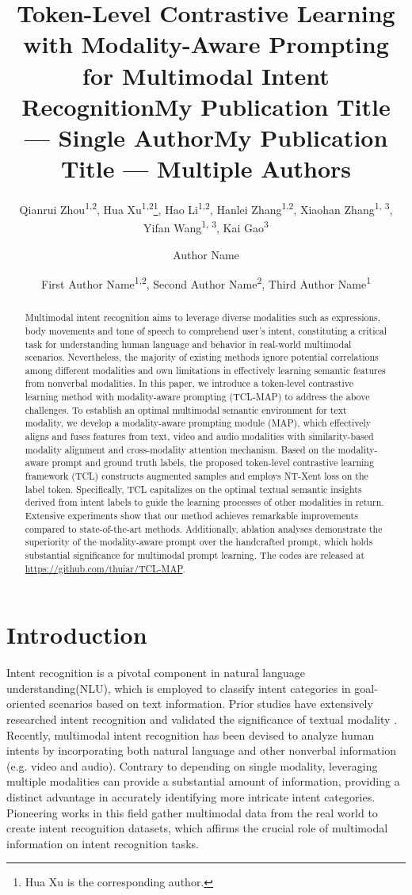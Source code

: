 \documentclass[letterpaper]{article} %
\title{Token-Level Contrastive Learning with Modality-Aware Prompting for Multimodal Intent Recognition}
\author{
Qianrui Zhou\textsuperscript{\rm 1,\rm 2},
Hua Xu\textsuperscript{\rm 1,\rm 2}\footnote{Hua Xu is the corresponding author.},
Hao Li\textsuperscript{\rm 1,\rm 2},
Hanlei Zhang\textsuperscript{\rm 1,\rm 2},
Xiaohan Zhang\textsuperscript{\rm 1, \rm 3},
Yifan Wang\textsuperscript{\rm 1, \rm 3},
Kai Gao\textsuperscript{\rm 3}
}
\title{My Publication Title --- Single Author}
\author {
Author Name
}
\title{My Publication Title --- Multiple Authors}
\author {
First Author Name\textsuperscript{\rm 1,\rm 2},
Second Author Name\textsuperscript{\rm 2},
Third Author Name\textsuperscript{\rm 1}
}
\begin{document}
\maketitle

\begin{abstract}
Multimodal intent recognition aims to leverage diverse modalities such as expressions, body movements and tone of speech to comprehend user's intent, constituting a critical task for understanding human language and behavior in real-world multimodal scenarios. Nevertheless, the majority of existing methods ignore potential correlations among different modalities and own limitations in effectively learning semantic features from nonverbal modalities. In this paper, we introduce a token-level contrastive learning method with modality-aware prompting (TCL-MAP) to address the above challenges. To establish an optimal multimodal semantic environment for text modality, we develop a modality-aware prompting module (MAP), which effectively aligns and fuses features from text, video and audio modalities with similarity-based modality alignment and cross-modality attention mechanism. Based on the modality-aware prompt and ground truth labels, the proposed token-level contrastive learning framework (TCL) constructs augmented samples and employs NT-Xent loss on the label token. Specifically, TCL capitalizes on the optimal textual semantic insights derived from intent labels to guide the learning processes of other modalities in return. Extensive experiments show that our method achieves remarkable improvements compared to state-of-the-art methods. Additionally, ablation analyses demonstrate the superiority of the modality-aware prompt over the handcrafted prompt, which holds substantial significance for multimodal prompt learning. The codes are released at \url{https://github.com/thuiar/TCL-MAP}.

\end{abstract}

\section{Introduction}

Intent recognition is a pivotal component in natural language understanding(NLU), which is employed to classify intent categories in goal-oriented scenarios based on text information. Prior studies have extensively researched intent recognition and validated the significance of textual modality \cite{zhang2021textoir, zhang2021discovering}. Recently, multimodal intent recognition has been devised to analyze human intents by incorporating both natural language and other nonverbal information (e.g. video and audio). Contrary to depending on single modality, leveraging multiple modalities can provide a substantial amount of information, providing a distinct advantage in accurately identifying more intricate intent categories. Pioneering works in this field \cite{10.1145/3503161.3547906, saha-etal-2020-towards} gather multimodal data from the real world to create intent recognition datasets, which affirms the crucial role of multimodal information on intent recognition tasks.
\end{document}
